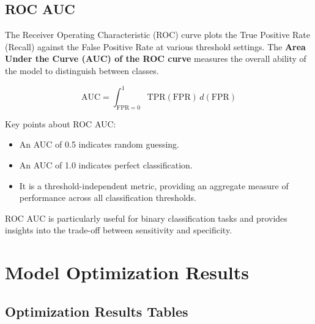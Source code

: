 \documentclass{article}%
\begin{document}
%
\subsection{ROC AUC}%
\label{subsec:ROCAUC}%

                The Receiver Operating Characteristic (ROC) curve plots the True Positive Rate (Recall) against the False Positive Rate at various threshold settings. 
                The \textbf{Area Under the Curve (AUC) of the ROC curve} measures the overall ability of the model to distinguish between classes. 

                \[
                \text{AUC} = \int_{\text{FPR}=0}^{1} \text{TPR}(\text{FPR}) \, d(\text{FPR})
                \]

                Key points about ROC AUC:
                \begin{itemize}
                    \item An AUC of 0.5 indicates random guessing.
                    \item An AUC of 1.0 indicates perfect classification.
                    \item It is a threshold-independent metric, providing an aggregate measure of performance across all classification thresholds.
                \end{itemize}

                ROC AUC is particularly useful for binary classification tasks and provides insights into the trade-off between sensitivity and specificity.
                

%
\newpage%
\section{Model Optimization Results}%
\label{sec:ModelOptimizationResults}%
\subsection{Optimization Results Tables}%
\label{subsec:OptimizationResultsTables}%
\end{document}
